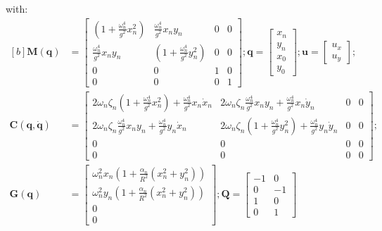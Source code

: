 \documentclass{ltxdockit}
\begin{document}
with:
\begin{equation}\label{eqk27aligned}
\begin{aligned}[b]
\mathbf{M}(\mathbf{q})
%
&= \begin{bmatrix}
(1 + \frac{\omega_n^4}{g^2} x_n^2) & \frac{\omega_n^4}{g^2} x_n y_n & 0 & 0 \\
\frac{\omega_n^4}{g^2} x_n y_n & (1 + \frac{\omega_n^4}{g^2} y_n^2) & 0 & 0 \\
0 & 0 & 1 & 0 \\
0 & 0 & 0 & 1 
\end{bmatrix};
\mathbf{q}
= \begin{bmatrix}
x_n \\
y_n \\
x_0 \\
y_0
\end{bmatrix};
\mathbf{u}
= \begin{bmatrix}
u_x \\
u_y 
\end{bmatrix}; \\
\mathbf{C}(\mathbf{q}, \dot{\mathbf{q}})
&= \begin{bmatrix}
2 \omega_n \zeta_n (1 + \frac{\omega_n^4}{g^2} x_n^2) + \frac{\omega_n^4}{g^2} x_n \dot x_n & 2 \omega_n \zeta_n \frac{\omega_n^4}{g^2} x_n y_n + \frac{\omega_n^4}{g^2} x_n \dot y_n & 0 & 0 \\
2 \omega_n \zeta_n \frac{\omega_n^4}{g^2} x_n y_n + \frac{\omega_n^4}{g^2} y_n \dot x_n & 2 \omega_n \zeta_n (1 + \frac{\omega_n^4}{g^2} y_n^2) + \frac{\omega_n^4}{g^2} y_n \dot y_n & 0 & 0 \\
0 & 0 & 0 & 0 \\
0 & 0 & 0 & 0
\end{bmatrix}; \\
\mathbf{G}(\mathbf{q})
&= \begin{bmatrix}
\omega_n^2 x_n (1 + \frac{\alpha_n}{R^2}(x_n^2 + y_n^2)) \\
\omega_n^2 y_n (1 + \frac{\alpha_n}{R^2}(x_n^2 + y_n^2)) \\
0 \\
0
\end{bmatrix};
\mathbf{Q}
= \begin{bmatrix}
-1 & 0 \\
0 & -1 \\
1 & 0\\
0 & 1
\end{bmatrix}
\end{aligned}
\end{equation}
\end{document}
